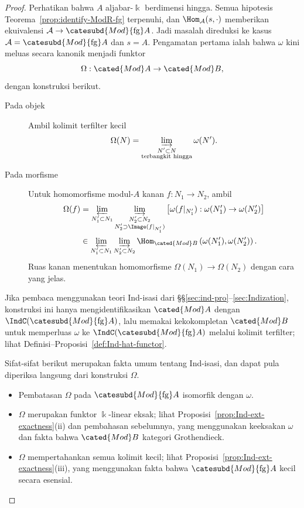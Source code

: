 \begin{proof}
	Perhatikan bahwa $A$ aljabar-$\Bbbk$ berdimensi hingga. Semua hipotesis
	Teorema~\ref{prop:identify-ModR-fg} terpenuhi, dan
	$\Hom_{\mathcal{A}}(s,\mathord\cdot)$ memberikan ekuivalensi
	$\mathcal{A}\to\catesubd{Mod}{\mathrm{fg}}A$. Jadi masalah direduksi
	ke kasus $\mathcal{A}=\catesubd{Mod}{\mathrm{fg}}A$ dan $s=A$.
	Pengamatan pertama ialah bahwa $\omega$ kini meluas secara kanonik
	menjadi funktor
	\[ \Omega: \cated{Mod}A \to \cated{Mod}B, \]
	dengan konstruksi berikut.
	\begin{description}
		\item[Pada objek] Ambil kolimit terfilter kecil
		\begin{equation}\label{eqn:Tannaka-tilde-omega}
			\Omega(N) = \varinjlim_{\substack{N' \subset N \\ \text{terbangkit hingga}}} \omega(N').
		\end{equation}
		\item[Pada morfisme] Untuk homomorfisme modul-$A$ kanan
		$f:N_1\to N_2$, ambil
		\begin{align*}
			\Omega(f) & = \varprojlim_{N'_1 \subset N_1} \varinjlim_{\substack{N'_2 \subset N_2 \\ N'_2 \supset \Image(f|_{N'_1}) }} \left[ \omega(f|_{N'_1}): \omega(N'_1) \to \omega(N'_2) \right] \\
			& \in \varprojlim_{N'_1 \subset N_1} \varinjlim_{N'_2 \subset N_2} \Hom_{\cated{Mod}B}\left( \omega(N'_1), \omega(N'_2)\right).
		\end{align*}
		Ruas kanan menentukan homomorfisme
		$\Omega(N_1)\to\Omega(N_2)$ dengan cara yang jelas.
	\end{description}

	Jika pembaca menggunakan teori Ind-isasi dari
	\S\S\ref{sec:ind-pro}--\ref{sec:Indization}, konstruksi ini hanya
	mengidentifikasikan $\cated{Mod}A$ dengan
	$\IndC(\catesubd{Mod}{\mathrm{fg}}A)$, lalu memakai kekokompletan
	$\cated{Mod}B$ untuk memperluas $\omega$ ke
	$\IndC(\catesubd{Mod}{\mathrm{fg}}A)$ melalui kolimit terfilter; lihat
	Definisi--Proposisi~\ref{def:Ind-hat-functor}.

	Sifat-sifat berikut merupakan fakta umum tentang Ind-isasi, dan dapat
	pula diperiksa langsung dari konstruksi $\Omega$.
	\begin{itemize}
		\item Pembatasan $\Omega$ pada
		$\catesubd{Mod}{\mathrm{fg}}A$ isomorfik dengan $\omega$.
		\item $\Omega$ merupakan funktor $\Bbbk$-linear eksak; lihat
		Proposisi~\ref{prop:Ind-ext-exactness}(ii) dan pembahasan sebelumnya,
		yang menggunakan keeksakan $\omega$ dan fakta bahwa
		$\cated{Mod}B$ kategori Grothendieck.
		\item $\Omega$ mempertahankan semua kolimit kecil; lihat
		Proposisi~\ref{prop:Ind-ext-exactness}(iii), yang menggunakan fakta
		bahwa $\catesubd{Mod}{\mathrm{fg}}A$ kecil secara esensial.
	\end{itemize}


\end{proof}
